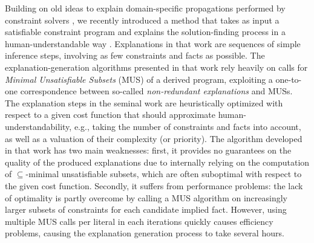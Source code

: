 


Building on old ideas to explain domain-specific propagations performed by constraint solvers  \cite{sqalli1996inference,freuder2001explanation}, we recently introduced a 
method that takes as input a satisfiable constraint program and explains the solution-finding process in a human-understandable way  \cite{ecai/BogaertsGCG20}. 
Explanations in that work are sequences of simple inference steps, involving as few constraints and facts as possible. 
The explanation-generation algorithms presented in that work rely heavily on calls for  \emph{Minimal Unsatisfiable Subsets} (MUS) \cite{marques2010minimal} of a derived program, exploiting a one-to-one correspondence between so-called \emph{non-redundant explanations} and MUSs.
The explanation steps in the seminal work are heuristically optimized with respect to a given cost function that should approximate human-understandability, e.g., taking the number of constraints and facts into account, as well as a valuation of their complexity (or priority). 
The algorithm developed in that work has two main weaknesses: first, it provides no guarantees on the quality of the produced explanations due to internally relying on the computation of $\subseteq$-minimal unsatisfiable subsets, which are often suboptimal with respect to the given cost function. 
Secondly, it suffers from performance problems: the lack of optimality is partly overcome by calling a MUS algorithm on increasingly larger subsets of constraints for each candidate implied fact. %
However, using multiple MUS calls per literal in each iterations quickly causes efficiency problems, causing the explanation generation process to take several hours.


